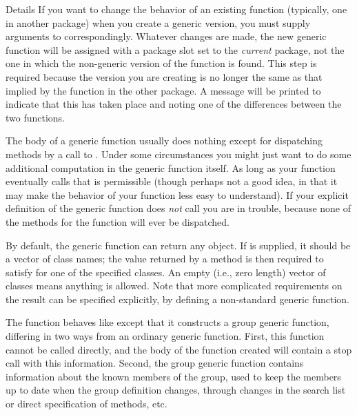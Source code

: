 \begin{Section}{Details}
If you want to change the behavior of an existing function (typically, one in another package) when you create a generic version, you must supply arguments to  correspondingly.
Whatever changes are made, the new generic function will be assigned with a package slot set to the \emph{current} package, not the one in which the non-generic version of the function is found.
This step is required because the version you are creating is no longer the same as that implied by the function in the other package.
A message will be printed to indicate that this has taken place and noting one of the differences between the two functions.


The body of a generic function usually does nothing
except for dispatching methods by a call to .
Under some circumstances you might just want to do some additional
computation in the generic function itself.  As long as your
function eventually calls  that is permissible
(though perhaps not a good idea, in that it may make the behavior of
your function less easy to understand).  If your explicit
definition of the generic function
does \emph{not} call  you are in trouble,
because none of the methods for the function will ever be
dispatched.

By default, the generic function can return any object.  If
 is supplied, it should be a vector of class names;
the value returned by a method is then required to satisfy
 for one of the specified classes.  An empty
(i.e., zero length) vector of classes means anything is allowed.  Note
that more complicated requirements on the result can be specified
explicitly, by defining a non-standard generic function.

The  function behaves like 
except that it constructs a group generic function, differing in two
ways from an ordinary generic function.  First, this function cannot
be called directly, and the body of the function created will contain
a stop call with this information.  Second, the group generic
function contains information about the known members of the group,
used to keep the members up to date when the group definition
changes, through changes in the search list or direct specification
of methods, etc.
\end{Section}
%
